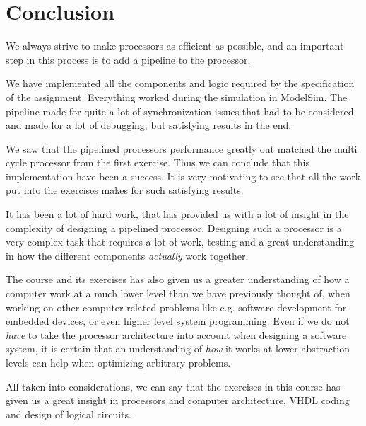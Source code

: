 \section{Conclusion}
We always strive to make processors as efficient as possible, and an
important step in this process is to add a pipeline to the processor.

We have implemented all the components and logic required by the specification 
of the assignment. Everything worked during the simulation in ModelSim.
The pipeline made for quite a lot of synchronization issues that had to be
considered and made for a lot of debugging, but satisfying results in the
end.

We saw that the pipelined processors performance greatly out matched the 
multi cycle processor from the first exercise. Thus we can conclude that this 
implementation have been a success. It is very motivating to see that all the
work put into the exercises makes for such satisfying results. 

It has been a lot of hard work, that has provided us with a lot of insight
in the complexity of designing a pipelined processor. Designing such 
a processor is a very complex task that requires a lot of work, testing and 
a great understanding in how the different components \textit{actually} 
work together. 

The course and its exercises has also given us a greater understanding of how a 
computer work at a much lower level than we have previously thought of,
when working on other computer-related
problems like e.g. software development for embedded devices, or even higher
level system programming. Even if we do not \textit{have} to take the processor
architecture into account when designing a software system, it is certain
that an understanding of \textit{how}
it works at lower abstraction levels can help when 
optimizing arbitrary problems.

All taken into considerations, we can say that the exercises in this
course has given us a great insight in processors and computer architecture,
VHDL coding and design of logical circuits. 